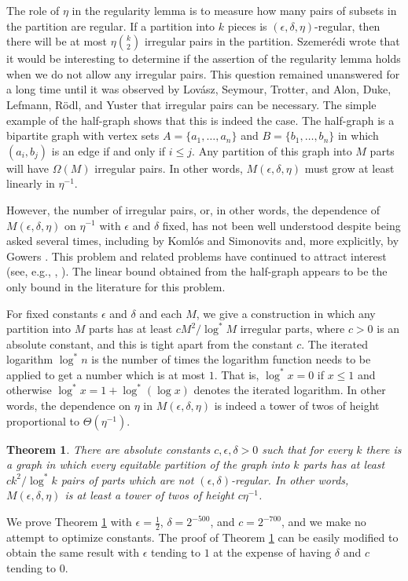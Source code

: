 \documentclass[11pt]{article}
\newtheorem{theorem}{Theorem}[section]
\begin{document}
The role of $\eta$ in the regularity lemma is to measure how many pairs of
subsets in the partition are regular. If a partition into $k$ pieces is
$(\epsilon, \delta, \eta)$-regular, then there will be at most $\eta
\binom{k}{2}$ irregular pairs in the partition. Szemer\'edi \cite{Sz} wrote
that it would be interesting to determine if the assertion of the regularity
lemma holds when we do not allow any irregular pairs. This question remained
unanswered for a long time until it was observed by Lov\'asz, Seymour, Trotter,
and Alon, Duke, Lefmann, R\"odl, and Yuster \cite{ADLRY} that irregular pairs
can be necessary. The simple example of the half-graph shows that this is
indeed the case. The half-graph is a bipartite graph with vertex sets
$A=\{a_1,\ldots,a_n\}$ and $B=\{b_1,\ldots,b_n\}$ in which $(a_i,b_j)$ is an
edge if and only if $i \leq j$. Any partition of this graph into $M$ parts will
have $\Omega(M)$ irregular pairs. In other words, $M(\epsilon,\delta,\eta)$
must grow at least linearly in $\eta^{-1}$.

However, the number of irregular pairs, or, in other words, the dependence of
$M(\epsilon,\delta,\eta)$ on $\eta^{-1}$ with $\epsilon$ and $\delta$ fixed,
has not been well understood despite being asked several times, including by
Koml\'os and Simonovits \cite{KoSi} and, more explicitly, by Gowers \cite{Go}.
This problem and related problems have continued to attract interest (see,
e.g., \cite{KoRo}, \cite{MSh}). The linear bound obtained from the half-graph
appears to be the only bound in the literature for this problem.

For fixed constants $\epsilon$ and $\delta$ and each $M$, we give a
construction in which any partition into $M$ parts has at least $cM^2/\log^* M$
irregular parts, where $c>0$ is an absolute constant, and this is tight apart
from the constant $c$. The iterated logarithm $\log^* n$ is the number of times
the logarithm function needs to be applied to get a number which is at most
$1$. That is, $\log^* x = 0$ if $x \leq 1$ and otherwise $\log^* x =1+\log^*
(\log x)$ denotes the iterated logarithm. In other words, the dependence on
$\eta$ in $M(\epsilon,\delta,\eta)$ is indeed a tower of twos of height
proportional to $\Theta(\eta^{-1})$.

\begin{theorem}\label{exceptionalpairs}
There are absolute constants $c,\epsilon,\delta>0$ such that for every $k$
there is a graph in which every equitable partition of the graph into $k$ parts
has at least $ck^2/\log^* k$ pairs of parts which are not
$(\epsilon,\delta)$-regular. In other words, $M(\epsilon,\delta,\eta)$ is at
least a tower of twos of height $c\eta^{-1}$.
\end{theorem}
We prove Theorem \ref{exceptionalpairs} with $\epsilon=\frac{1}{2}$,
$\delta=2^{-500}$, and $c=2^{-700}$, and we make no attempt to optimize
constants. The proof of Theorem \ref{exceptionalpairs} can be easily modified
to obtain the same result with $\epsilon$ tending to $1$ at the expense of
having $\delta$ and $c$ tending to $0$.
\end{document}
